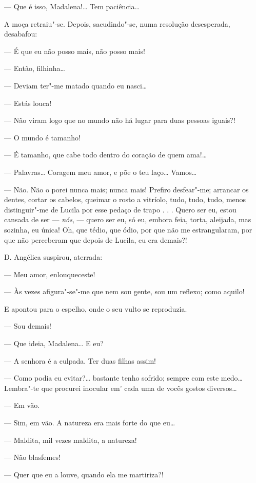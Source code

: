 --- Que é isso, Madalena!\ldots{} Tem paciência\ldots{}

A moça retraiu"-se. Depois, sacudindo"-se, numa resolução desesperada,
desabafou:

--- É que eu não posso mais, não posso mais!

--- Então, filhinha\ldots{}

--- Deviam ter"-me matado quando eu nasci\ldots{}

--- Estás louca!

--- Não viram logo que no mundo não há lugar para duas pessoas iguais?!

--- O mundo é tamanho!

--- É tamanho, que cabe todo dentro do coração de quem ama!\ldots{}

--- Palavras\ldots{} Coragem meu amor, e põe o teu laço\ldots{} Vamos\ldots{}

--- Não. Não o porei nunca mais; nunca mais! Prefiro desfear"-me;
arrancar os dentes, cortar os cabelos, queimar o rosto a vitríolo, tudo,
tudo, tudo, menos distinguir"-me de Lucila por esse pedaço de trapo . . .
Quero ser eu, estou cansada de ser --- \emph{nós}, --- quero ser eu, só
eu, embora feia, torta, aleijada, mas sozinha, eu única! Oh, que tédio,
que ódio, por que não me estrangularam, por que não perceberam que
depois de Lucila, eu era demais?!

D. Angélica suspirou, aterrada:

--- Meu amor, enlouqueceste!

--- Às vezes afigura"-se"-me que nem sou gente, sou um reflexo; como
aquilo!

E apontou para o espelho, onde o seu vulto se reproduzia.

--- Sou demais!

--- Que ideia, Madalena\ldots{} E eu?

--- A senhora é a culpada. Ter duas filhas assim!

--- Como podia eu evitar?\ldots{} bastante tenho sofrido; sempre com este
medo\ldots{} Lembra"-te que procurei inocular em' cada uma de vocês gostos
diversos\ldots{}

--- Em vão.

--- Sim, em vão. A natureza era mais forte do que eu\ldots{}

--- Maldita, mil vezes maldita, a natureza!

--- Não blasfemes!

--- Quer que eu a louve, quando ela me martiriza?!

